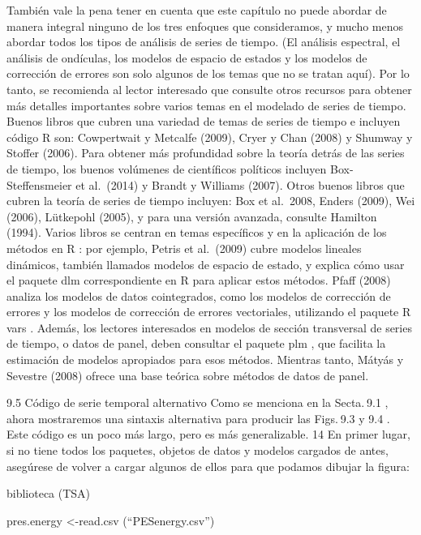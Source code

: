 \documentclass[
]{book}
\begin{document}
También vale la pena tener en cuenta que este capítulo no puede abordar de manera integral ninguno de los tres enfoques que consideramos, y mucho menos abordar todos los tipos de análisis de series de tiempo. (El análisis espectral, el análisis de ondículas, los modelos de espacio de estados y los modelos de corrección de errores son solo algunos de los temas que no se tratan aquí). Por lo tanto, se recomienda al lector interesado que consulte otros recursos para obtener más detalles importantes sobre varios temas en el modelado de series de tiempo. Buenos libros que cubren una variedad de temas de series de tiempo e incluyen código R son: Cowpertwait y Metcalfe (2009), Cryer y Chan (2008) y Shumway y Stoffer (2006). Para obtener más profundidad sobre la teoría detrás de las series de tiempo, los buenos volúmenes de científicos políticos incluyen Box-Steffensmeier et al.~(2014) y Brandt y Williams (2007). Otros buenos libros que cubren la teoría de series de tiempo incluyen: Box et al.~2008, Enders (2009), Wei (2006), Lütkepohl (2005), y para una versión avanzada, consulte Hamilton (1994). Varios libros se centran en temas específicos y en la aplicación de los métodos en R : por ejemplo, Petris et al.~(2009) cubre modelos lineales dinámicos, también llamados modelos de espacio de estado, y explica cómo usar el paquete dlm correspondiente en R para aplicar estos métodos. Pfaff (2008) analiza los modelos de datos cointegrados, como los modelos de corrección de errores y los modelos de corrección de errores vectoriales, utilizando el paquete R vars . Además, los lectores interesados \hspace{0pt}\hspace{0pt}en modelos de sección transversal de series de tiempo, o datos de panel, deben consultar el paquete plm , que facilita la estimación de modelos apropiados para esos métodos. Mientras tanto, Mátyás y Sevestre (2008) ofrece una base teórica sobre métodos de datos de panel.

9.5 Código de serie temporal alternativo
Como se menciona en la Secta. 9.1 , ahora mostraremos una sintaxis alternativa para producir las Figs. 9.3 y 9.4 . Este código es un poco más largo, pero es más generalizable. 14 En primer lugar, si no tiene todos los paquetes, objetos de datos y modelos cargados de antes, asegúrese de volver a cargar algunos de ellos para que podamos dibujar la figura:

biblioteca (TSA)

pres.energy \textless-read.csv (``PESenergy.csv'')
\end{document}
